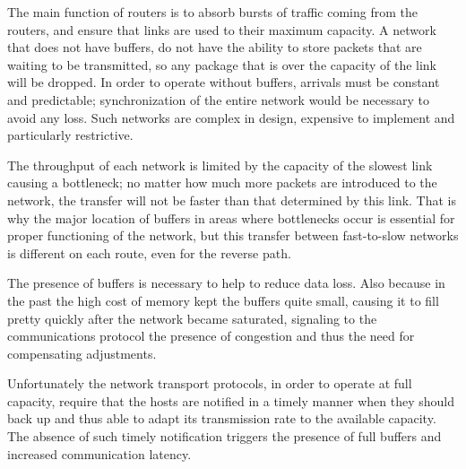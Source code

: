 The main function of routers is to absorb bursts of traffic coming from the
routers, and ensure that links are used to their maximum capacity. A network
that does not have buffers, do not have the ability to store packets that are
waiting to be transmitted, so any package that is over the capacity of the
link will be dropped. In order to operate without buffers, arrivals must be
constant and predictable; synchronization of the entire network would be
necessary to avoid any loss. Such networks are complex in design, expensive to
implement and particularly restrictive.

The throughput of each network is limited by the capacity of the slowest link
causing a bottleneck; no matter how much more packets are introduced to the
network, the transfer will not be faster than that determined by this link.
That is why the major location of buffers in areas where bottlenecks occur is
essential for proper functioning of the network, but this transfer between
fast-to-slow networks is different on each route, even for the reverse path.

The presence of buffers is necessary to help to reduce data loss. Also because
in the past the high cost of memory kept the buffers quite small, causing it
to fill pretty quickly after the network became saturated, signaling to the
communications protocol the presence of congestion and thus the need for
compensating adjustments.

Unfortunately the network transport protocols, in order to operate at full
capacity, require that the hosts are notified in a timely manner when they
should back up and thus able to adapt its transmission rate to the available
capacity. The absence of such timely notification triggers the presence of
full buffers and increased communication latency.